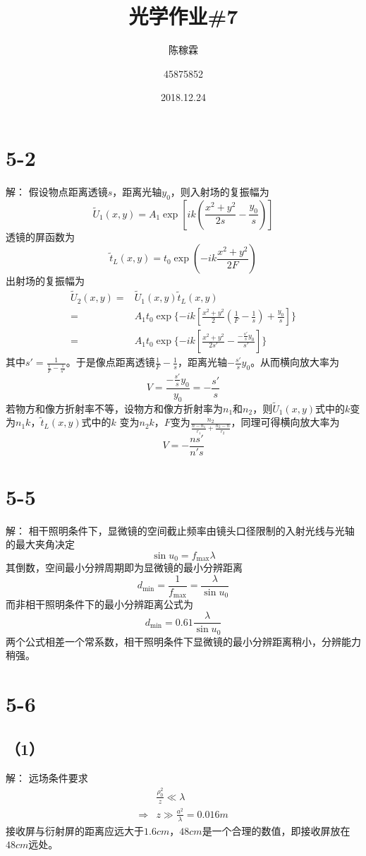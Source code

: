 \documentclass[10pt,a4paper]{article}
\title{光学作业\#7}
\author{陈稼霖 \and 45875852}
\date{2018.12.24}
\begin{document}
\maketitle
\section*{5-2}解：
假设物点距离透镜$s$，距离光轴$y_0$，则入射场的复振幅为
\[
\widetilde{U}_1(x,y)=A_1\exp[ik(\frac{x^2+y^2}{2s}-\frac{y_0}{s})]
\]
透镜的屏函数为
\[
\widetilde{t}_L(x,y)=t_0\exp(-ik\frac{x^2+y^2}{2F})
\]
出射场的复振幅为
\begin{align*}
\widetilde{U}_2(x,y)=&\widetilde{U}_1(x,y)\widetilde{t}_L(x,y)\\
=&A_1t_0\exp\{-ik[\frac{x^2+y^2}{2}(\frac{1}{F}-\frac{1}{s})+\frac{y_0}{s}]\}\\
=&A_1t_0\exp\{-ik[\frac{x^2+y^2}{2s'}-\frac{-\frac{s'}{s}y_0}{s'}]\}
\end{align*}
其中$s'=\frac{1}{\frac{1}{F}-\frac{1}{s'}}$。于是像点距离透镜$\frac{1}{F}-\frac{1}{s}$，距离光轴$-\frac{s'}{s}y_0$。从而横向放大率为
\[
V=\frac{-\frac{s'}{s}y_0}{y_0}=-\frac{s'}{s}
\]
若物方和像方折射率不等，设物方和像方折射率为$n_1$和$n_2$，则$\widetilde{U}_1(x,y)$式中的$k$变为$n_1k$，$\widetilde{t}_L(x,y)$式中的$k$ 变为$n_2k$，$F$变为$\frac{n_2}{\frac{n-n_1}{r_1}+\frac{n_2-n}{r_2}}$，同理可得横向放大率为
\[
V=-\frac{ns'}{n's}
\]
\section*{5-5}解：
相干照明条件下，显微镜的空间截止频率由镜头口径限制的入射光线与光轴的最大夹角决定
\[
\sin u_0=f_{\max}\lambda
\]
其倒数，空间最小分辨周期即为显微镜的最小分辨距离
\[
d_{\min}=\frac{1}{f_{\max}}=\frac{\lambda}{\sin u_0}
\]
而非相干照明条件下的最小分辨距离公式为
\[
d_{\min}=0.61\frac{\lambda}{\sin u_0}
\]
两个公式相差一个常系数，相干照明条件下显微镜的最小分辨距离稍小，分辨能力稍强。
\section*{5-6}
\subsection*{（1）}解：
远场条件要求
\begin{align*}
&\frac{\rho_0^2}{z}\ll\lambda\\
\Longrightarrow&z\gg\frac{a^2}{\lambda}=0.016m
\end{align*}
接收屏与衍射屏的距离应远大于$1.6cm$，$48cm$是一个合理的数值，即接收屏放在$48cm$远处。
\end{document}
